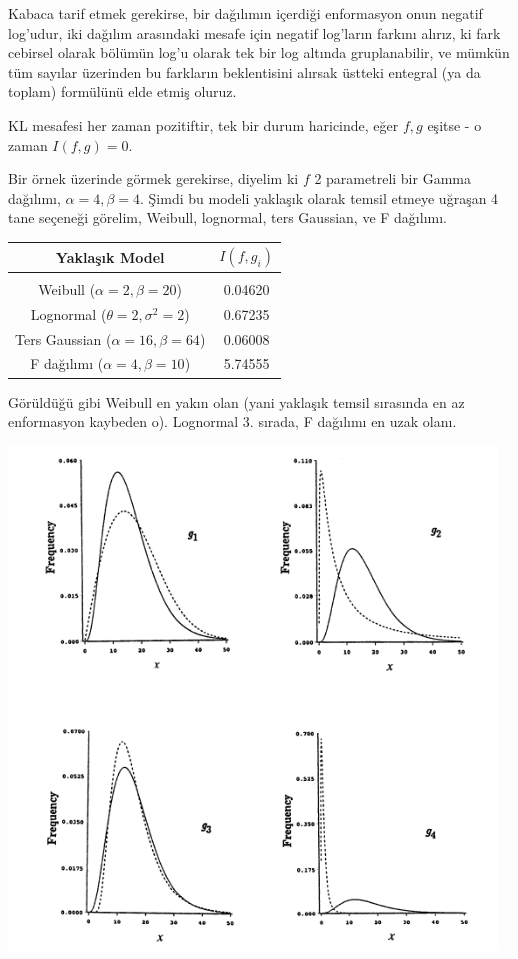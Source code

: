 \documentclass[12pt,fleqn]{article}\usepackage{../../common}
\begin{document}
Kabaca tarif etmek gerekirse, bir dağılımın içerdiği enformasyon onun
negatif log'udur, iki dağılım arasındaki mesafe için negatif log'ların
farkını alırız, ki fark cebirsel olarak bölümün log'u olarak tek bir log
altında gruplanabilir, ve mümkün tüm sayılar üzerinden bu farkların
beklentisini alırsak üstteki entegral (ya da toplam) formülünü elde etmiş
oluruz. 

KL mesafesi her zaman pozitiftir, tek bir durum haricinde, eğer $f,g$
eşitse - o zaman $I(f,g) = 0$.

Bir örnek üzerinde görmek gerekirse, diyelim ki $f$ 2 parametreli bir Gamma
dağılımı, $\alpha=4,\beta=4$. Şimdi bu modeli yaklaşık olarak temsil etmeye
uğraşan 4 tane seçeneği görelim, Weibull, lognormal, ters Gaussian, ve F
dağılımı. 

\begin{tabular}{cc}
Yaklaşık Model & $I(f,g_i)$ \\
\hline \\
Weibull ($\alpha=2,\beta=20$) & 0.04620 \\
Lognormal ($\theta=2,\sigma^2=2$) & 0.67235 \\ 
Ters Gaussian ($\alpha=16,\beta=64$) & 0.06008 \\
F dağılımı ($\alpha=4,\beta=10$) & 5.74555
\end{tabular}

Görüldüğü gibi Weibull en yakın olan (yani yaklaşık temsil sırasında en az
enformasyon kaybeden o). Lognormal 3. sırada, F dağılımı en uzak olanı.

\includegraphics[width=35em]{stat_kl_01.png}
\end{document}
